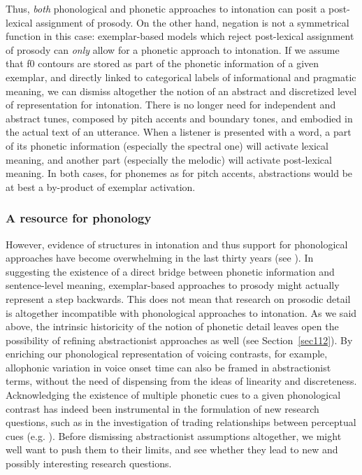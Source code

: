 Thus, \textit{both} phonological and phonetic approaches to intonation can posit a post-lexical assignment of prosody. On the other hand, negation is not a symmetrical function in this case: exemplar-based models which reject post-lexical assignment of prosody can \textit{only} allow for a phonetic approach to intonation. If we assume that f0 contours are stored as part of the phonetic information of a given exemplar, and directly linked to categorical labels of informational and pragmatic meaning, we can dismiss altogether the notion of an abstract and discretized level of representation for intonation. There is no longer need for independent and abstract tunes, composed by pitch accents and boundary tones, and embodied in the actual text of an utterance. When a listener is presented with a word, a part of its phonetic information (especially the spectral one) will activate lexical meaning, and another part (especially the melodic) will activate post-lexical meaning. In both cases, for phonemes as for pitch accents, abstractions would be at best a by-product of exemplar activation. 

\subsubsection{A resource for phonology}\label{sec1132}
However, evidence of structures in intonation and thus support for phonological approaches have become overwhelming in the last thirty years (see \citealt[§1.3 for a review]{ladd2008intonational}). In suggesting the existence of a direct bridge between phonetic information and sentence-level meaning, exemplar-based approaches to prosody might actually represent a step backwards. This does not mean that research on prosodic detail is altogether incompatible with phonological approaches to intonation. As we said above, the intrinsic historicity of the notion of phonetic detail leaves open the possibility of refining abstractionist approaches as well (see Section~\ref{sec112}). By enriching our phonological representation of voicing contrasts, for example, allophonic variation in voice onset time can also be framed in abstractionist terms, without the need of dispensing from the ideas of linearity and discreteness. Acknowledging the existence of multiple phonetic cues to a given phonological contrast has indeed been instrumental in the formulation of new research questions, such as in the investigation of trading relationships between perceptual cues (e.g. \citealt{repp1979relative}). Before dismissing abstractionist assumptions altogether, we might well want to push them to their limits, and see whether they lead to new and possibly interesting research questions.

